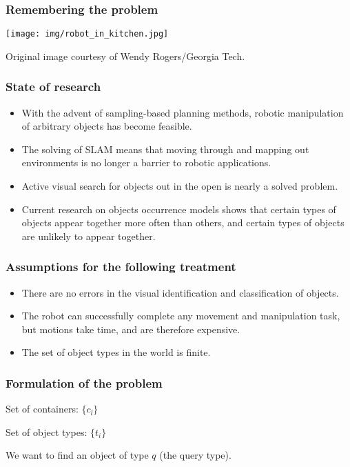 \begin{frame}
  \frametitle{Remembering the problem}
  \begin{center}
    \texttt{[image: img/robot\_in\_kitchen.jpg]}

    \tiny{Original image courtesy of Wendy Rogers/Georgia Tech.}
  \end{center}
\end{frame}

\begin{frame}
  \frametitle{State of research}
  \begin{itemize}
  \item With the advent of sampling-based planning methods, robotic
    manipulation of arbitrary objects has become feasible.
  \item The solving of SLAM means that moving through and mapping out
    environments is no longer a barrier to robotic applications.
  \item Active visual search for objects out in the open is nearly a solved
    problem.
  \item Current research on objects occurrence models shows that certain types of
    objects appear together more often than others, and certain types of objects
    are unlikely to appear together.
  \end{itemize}
\end{frame}

\begin{frame}
  \frametitle{Assumptions for the following treatment}
  \begin{itemize}
  \item There are no errors in the visual identification and classification of objects.
  \item The robot can successfully complete any movement and manipulation task,
    but motions take time, and are therefore expensive.
  \item The set of object types in the world is finite.
  \end{itemize}
\end{frame}

\begin{frame}
  \frametitle{Formulation of the problem}
  \begin{center}
    \vspace{-0.13in}
    Set of containers: $\{c_l\}$


    Set of object types: $\{t_i\}$


    We want to find an object of type $q$ (the query type).


  \end{center}
\end{frame}

